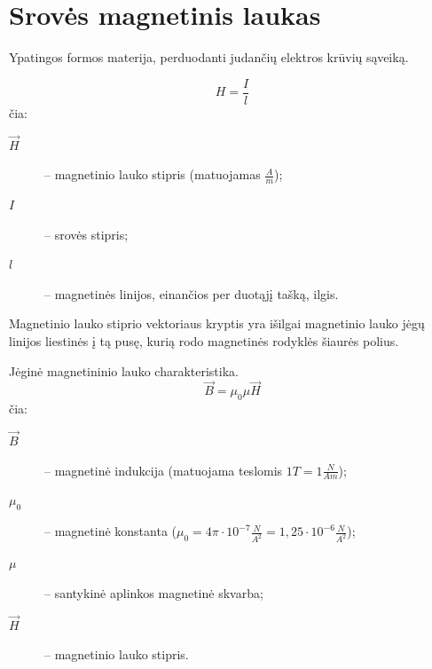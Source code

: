 \section{Srovės magnetinis laukas}

\begin{defn}
  Ypatingos formos materija, perduodanti judančių elektros krūvių
  sąveiką.
\end{defn}

\begin{defn}
  \begin{equation*}
    H = \frac{I}{l}
  \end{equation*}
  čia:
  \begin{description}
    \item[$\vec{H}$] – magnetinio lauko stipris (matuojamas $\frac{A}{m}$);
    \item[$I$] – srovės stipris;
    \item[$l$] – magnetinės linijos, einančios per duotąjį tašką, ilgis.
  \end{description}
  Magnetinio lauko stiprio vektoriaus kryptis yra išilgai magnetinio
  lauko jėgų linijos liestinės į tą pusę, kurią rodo magnetinės rodyklės
  šiaurės polius.
\end{defn}

\begin{defn}
  Jėginė magnetininio lauko charakteristika.
  \begin{equation*}
    \vec{B} = \mu_{0} \mu \vec{H}
  \end{equation*}
  čia:
  \begin{description}
    \item[$\vec{B}$] – magnetinė indukcija (matuojama teslomis
      $1T = 1\frac{N}{Am}$);
    \item[$\mu_{0}$] – magnetinė konstanta 
      ($\mu_{0} = 4\pi \cdot 10^{-7} \frac{N}{A^{2}} = 1,25 \cdot 10^{-6} 
      \frac{N}{A^{2}}$);
    \item[$\mu$] – santykinė aplinkos magnetinė skvarba;
    \item[$\vec{H}$] – magnetinio lauko stipris.
  \end{description}
\end{defn}

